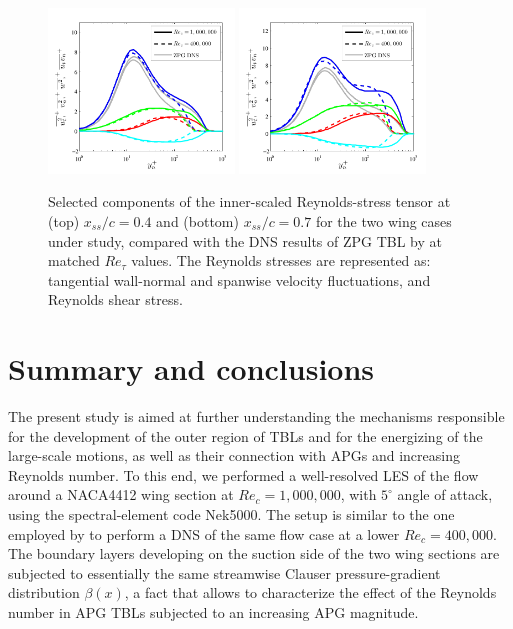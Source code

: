 \documentclass[preprint,12pt,authoryear]{elsarticle}
\begin{document}
\begin{figure}[t]
\centering
\includegraphics[width=0.44\textwidth]{uup_vs_yp_04}
\includegraphics[width=0.44\textwidth]{uup_vs_yp_07}
\caption{Selected components of the inner-scaled Reynolds-stress tensor at (top) $x_{ss}/c=0.4$ and (bottom) $x_{ss}/c=0.7$ for the two wing cases under study, compared with the DNS results of ZPG TBL by \cite{schlatter_orlu10} at matched $Re_{\tau}$ values. The Reynolds stresses are represented as: {\color{blue}\solid} tangential {\color{red}\solid} wall-normal and {\color{green}\solid} spanwise velocity fluctuations, and {\color{cyan}\solid} Reynolds shear stress.}
\label{uup_vs_yp}
\end{figure}

\section{Summary and conclusions}

The present study is aimed at further understanding the mechanisms responsible for the development of the outer region of TBLs and for the energizing of the large-scale motions, as well as their connection with APGs and increasing Reynolds number. To this end, we performed a well-resolved LES of the flow around a NACA4412 wing section at $Re_{c}=1,000,000$, with $5^{\circ}$ angle of attack, using the spectral-element code Nek5000. The setup is similar to the one employed by \cite{hosseini_et_al} to perform a DNS of the same flow case at a lower $Re_{c}=400,000$. The boundary layers developing on the suction side of the two wing sections are subjected to essentially the same streamwise Clauser pressure-gradient distribution $\beta(x)$, a fact that allows to characterize the effect of the Reynolds number in APG TBLs subjected to an increasing APG magnitude. 
\end{document}
